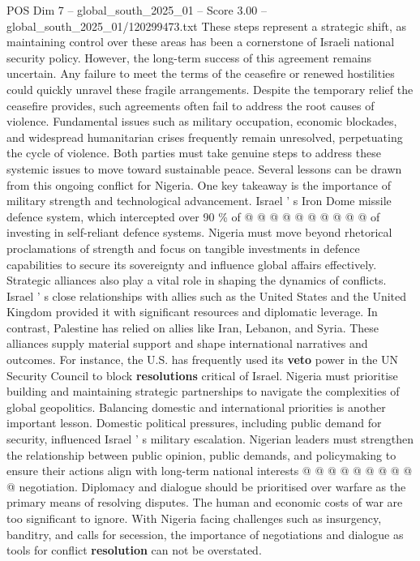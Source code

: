 \begin{textsample}{POS Dim 7 – global\_south\_2025\_01 – Score 3.00 – global\_south\_2025\_01/120299473.txt}
These steps represent a strategic shift, as maintaining control over these areas has been a cornerstone of Israeli national security policy.
However, the long-term success of this agreement remains uncertain.
Any failure to meet the terms of the ceasefire or renewed hostilities could quickly unravel these fragile arrangements.
Despite the temporary relief the ceasefire provides, such agreements often fail to address the root causes of violence.
Fundamental issues such as military occupation, economic blockades, and widespread humanitarian crises frequently remain unresolved, perpetuating the cycle of violence.
Both parties must take genuine steps to address these systemic issues to move toward sustainable peace.
Several lessons can be drawn from this ongoing conflict for Nigeria.
One key takeaway is the importance of military strength and technological advancement.
Israel ' s Iron Dome missile defence system, which intercepted over 90 \% of @ @ @ @ @ @ @ @ @ @ of investing in self-reliant defence systems.
Nigeria must move beyond rhetorical proclamations of strength and focus on tangible investments in defence capabilities to secure its sovereignty and influence global affairs effectively.
Strategic alliances also play a vital role in shaping the dynamics of conflicts.
Israel ' s close relationships with allies such as the United States and the United Kingdom provided it with significant resources and diplomatic leverage.
In contrast, Palestine has relied on allies like Iran, Lebanon, and Syria.
These alliances supply material support and shape international narratives and outcomes.
For instance, the U.S. has frequently used its \textbf{veto} power in the UN Security Council to block \textbf{resolutions} critical of Israel.
Nigeria must prioritise building and maintaining strategic partnerships to navigate the complexities of global geopolitics.
Balancing domestic and international priorities is another important lesson.
Domestic political pressures, including public demand for security, influenced Israel ' s military escalation.
Nigerian leaders must strengthen the relationship between public opinion, public demands, and policymaking to ensure their actions align with long-term national interests @ @ @ @ @ @ @ @ @ @ negotiation.
Diplomacy and dialogue should be prioritised over warfare as the primary means of resolving disputes.
The human and economic costs of war are too significant to ignore.
With Nigeria facing challenges such as insurgency, banditry, and calls for secession, the importance of negotiations and dialogue as tools for conflict \textbf{resolution} can not be overstated.

\end{textsample}
